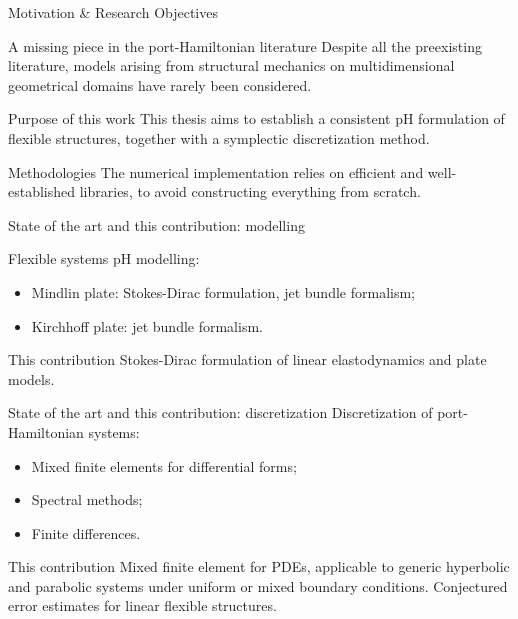 \documentclass[aspectratio=169]{ISAE-Beamer}
\begin{document}
\begin{frame}{Motivation \& Research Objectives}

\begin{alertblock}{A missing piece in the port-Hamiltonian literature}
Despite all the preexisting literature, models arising from structural mechanics on multidimensional geometrical domains have rarely been considered. 
\end{alertblock}

\begin{block}{Purpose of this work}
This thesis aims to establish a consistent pH formulation of flexible structures, together with a symplectic discretization method.
\end{block}

\begin{exampleblock}{Methodologies}
The numerical implementation relies on efficient and well-established libraries, to avoid constructing everything from scratch.
\end{exampleblock}

\end{frame}

\begin{frame}{State of the art and this contribution: modelling}

Flexible systems pH modelling:
\begin{itemize}
\item Mindlin plate: Stokes-Dirac formulation, jet bundle formalism;
\item Kirchhoff plate: jet bundle formalism.
\end{itemize}
\begin{exampleblock}{This contribution}
Stokes-Dirac formulation of linear elastodynamics and plate models.
\end{exampleblock}
\end{frame}

\begin{frame}{State of the art and this contribution: discretization}
Discretization of port-Hamiltonian systems:
\begin{itemize}
\item Mixed finite elements for differential forms;
\item Spectral methods;
\item Finite differences.
\end{itemize}

\begin{exampleblock}{This contribution}
	Mixed finite element for PDEs, applicable to generic hyperbolic and parabolic systems under uniform or mixed boundary conditions. Conjectured error estimates for linear flexible structures.
\end{exampleblock}

\end{frame}
\end{document}

